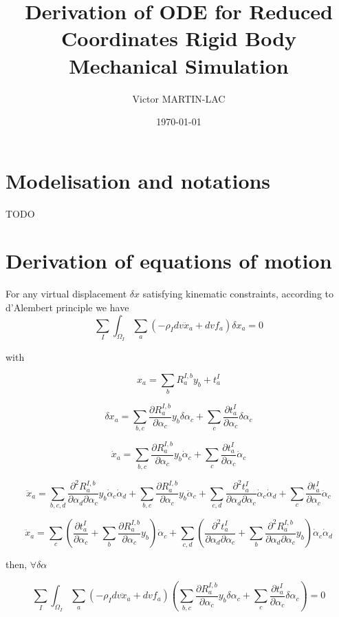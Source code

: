 \documentclass{article}
\title{Derivation of ODE for Reduced Coordinates Rigid Body Mechanical Simulation}
\author{Victor MARTIN-LAC}
\date{\today}
\begin{document}
\maketitle

\section{Modelisation and notations}

TODO

\section{Derivation of equations of motion}

For any virtual displacement $\delta x$ satisfying kinematic constraints, according to d'Alembert principle we have
$$
\sum_I \int_{\Omega_I} 
\sum_a (-\rho_I dv \ddot{x}_a + dv f_a) \delta x_a = 0
$$

with

$$
x_a = \sum_b R^{I,b}_a y_b + t^I_a
$$

$$
\delta x_a = \sum_{b,c} \frac{ \partial R^{I,b}_a }{ \partial \alpha_c } y_b \delta \alpha_c
+ \sum_c \frac{\partial t^I_a}{\partial \alpha_c} \delta \alpha_c
$$

$$
\dot{x}_a = \sum_{b,c} \frac{ \partial R^{I,b}_a }{ \partial \alpha_c } y_b \dot{\alpha}_c
+ \sum_c \frac{\partial t^I_a}{\partial \alpha_c} \dot{\alpha}_c
$$

$$
\ddot{x}_a =
\sum_{b,c,d} \frac{ \partial^2 R^{I,b}_a }{ \partial \alpha_d \partial \alpha_c } y_b \dot{\alpha}_c \dot{\alpha}_d +
\sum_{b,c} \frac{ \partial R^{I,b}_a }{ \partial \alpha_c } y_b \ddot{\alpha}_c +
\sum_{c,d} \frac{\partial^2 t^I_a}{\partial \alpha_d \partial \alpha_c} \dot{\alpha}_c \dot{\alpha}_d +
\sum_{c} \frac{\partial t^I_a}{\partial \alpha_c} \ddot{\alpha}_c
$$

$$
\ddot{x}_a =
\sum_{c} ( \frac{\partial t^I_a}{\partial \alpha_c} +  \sum_{b} \frac{ \partial R^{I,b}_a }{ \partial \alpha_c } y_b ) \ddot{\alpha}_c +
\sum_{c,d} ( \frac{\partial^2 t^I_a}{\partial \alpha_d \partial \alpha_c} + \sum_{b} \frac{ \partial^2 R^{I,b}_a }{ \partial \alpha_d \partial \alpha_c } y_b ) \dot{\alpha}_c \dot{\alpha}_d
$$

then, $\forall \delta \alpha$

$$
\sum_I \int_{\Omega_I} 
\sum_a (-\rho_I dv \ddot{x}_a + dv f_a) (
\sum_{b,c} \frac{ \partial R^{I,b}_a }{ \partial \alpha_c } y_b \delta \alpha_c
+ \sum_c \frac{\partial t^I_a}{\partial \alpha_c} \delta \alpha_c ) = 0
$$
\end{document}
